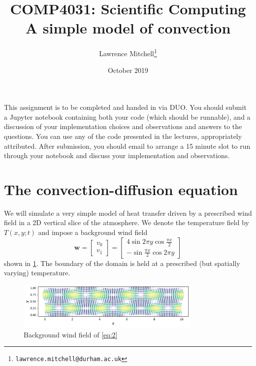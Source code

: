 \documentclass[11pt,a4paper]{article}
\title{COMP4031: Scientific Computing\\A simple model of convection}
\author{Lawrence Mitchell\thanks{\texttt{lawrence.mitchell@durham.ac.uk}}}
\date{October 2019}
\renewcommand{\vec}[1]{\ensuremath{\mathbf{#1}}}
\begin{document}
\maketitle{}

\noindent
This assignment is to be completed and handed in via DUO. You should
submit a Jupyter notebook containing both your code (which should be
runnable), and a discussion of your implementation choices and
observations and answers to the questions. You can use any of the code
presented in the lectures, appropriately attributed. After submission,
you should email to arrange a 15 minute slot to run through your
notebook and discuss your implementation and observations.

\section{The convection-diffusion equation}
\label{sec:part1}

We will simulate a very simple model of heat transfer driven by a
prescribed wind field in a 2D vertical slice of the atmosphere.
We denote the temperature field by $T(x, y; t)$ and impose a
background wind field
\begin{equation}
  \label{eq:2}
  \vec{w} = \begin{bmatrix}v_0\\v_1\end{bmatrix} = \begin{bmatrix}
    4 \sin 2\pi y \cos \frac{\pi x}{2}\\
    -\sin \frac{\pi x}{2} \cos 2\pi y\end{bmatrix}
\end{equation}
shown in \cref{fig:wind}. The boundary of the domain is held at a
prescribed (but spatially varying) temperature.
\begin{figure}[htbp]
  \centering
  \includegraphics[width=0.8\textwidth]{wind-field}
  \caption{Background wind field of \cref{eq:2}}
  \label{fig:wind}
\end{figure}
\end{document}
